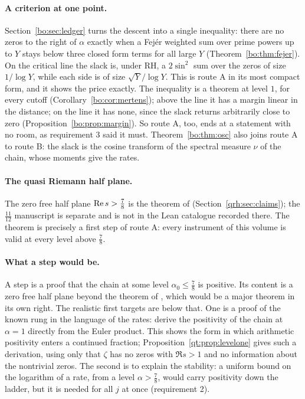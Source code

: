 \paragraph{A criterion at one point.} Section~\ref{bo:sec:ledger} turns the descent into a single inequality: there are no zeros to the right of $\alpha$ exactly when a Fejér weighted sum over prime powers up to $Y$ stays below three closed form terms for all large $Y$ (Theorem~\ref{bo:thm:fejer}). On the critical line the slack is, under RH, a $2\sin^2$ sum over the zeros of size $1/\log Y$, while each side is of size $\sqrt Y/\log Y$. This is route A in its most compact form, and it shows the price exactly. The inequality is a theorem at level $1$, for every cutoff (Corollary~\ref{bo:cor:mertens}); above the line it has a margin linear in the distance; on the line it has none, since the slack returns arbitrarily close to zero (Proposition~\ref{bo:prop:margin}). So route A, too, ends at a statement with no room, as requirement 3 said it must. Theorem~\ref{bo:thm:osc} also joins route A to route B: the slack is the cosine transform of the spectral measure $\nu$ of the chain, whose moments give the rates.

\paragraph{The quasi Riemann half plane.} The zero free half plane $\operatorname{Re} s>\frac78$ is the theorem of \cite{OAI26a} (Section~\ref{qrh:sec:claims}); the $\frac{11}{12}$ manuscript \cite{OAI26b} is separate and is not in the Lean catalogue recorded there. The theorem is precisely a first step of route A: every instrument of this volume is valid at every level above $\frac78$.
\paragraph{What a step would be.} A step is a proof that the chain at some level $\alpha_0\le\frac78$ is positive. Its content is a zero free half plane beyond the theorem of \cite{OAI26a}, which would be a major theorem in its own right. The realistic first targets are below that. One is a proof of the known rung in the language of the rates: derive the positivity of the chain at $\alpha=1$ directly from the Euler product. This shows the form in which arithmetic positivity enters a continued fraction; Proposition~\ref{qt:prop:levelone} gives such a derivation, using only that $\zeta$ has no zeros with $\Re s>1$ and no information about the nontrivial zeros. The second is to explain the stability: a uniform bound on the logarithm of a rate, from a level $\alpha>\frac78$, would carry positivity down the ladder, but it is needed for all $j$ at once (requirement 2).


